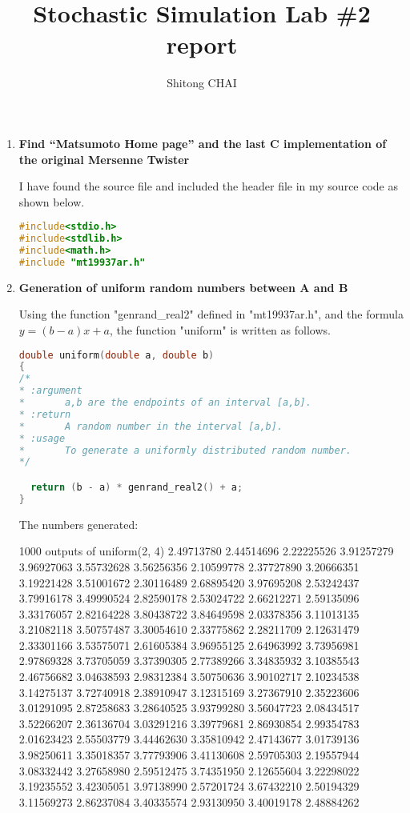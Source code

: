 \documentclass{article}
\title{Stochastic Simulation Lab \#2 report}
\author{Shitong CHAI}
\date{}
\begin{document}
\maketitle 

\begin{enumerate}
\item{\textbf{Find “Matsumoto Home page” and the last C implementation of the original Mersenne Twister}}

I have found the source file and included the header file in my source code as shown below.
\begin{lstlisting}[language=C]
#include<stdio.h>
#include<stdlib.h>
#include<math.h>
#include "mt19937ar.h"
\end{lstlisting}

\item{\textbf{Generation of uniform random numbers between A and B}}

Using the function "genrand\_real2" defined in "mt19937ar.h", and the formula $y=(b-a)x+a$, the function "uniform" is written as follows.

\begin{lstlisting}[language=C]
double uniform(double a, double b)
{
/*
* :argument 
*       a,b are the endpoints of an interval [a,b]. 
* :return  
*       A random number in the interval [a,b].
* :usage
*       To generate a uniformly distributed random number.
*/

  return (b - a) * genrand_real2() + a;
}
\end{lstlisting}
The numbers generated:
\begin{messageshell}
1000 outputs of uniform(2, 4)
2.49713780 2.44514696 2.22225526 3.91257279 3.96927063
3.55732628 3.56256356 2.10599778 2.37727890 3.20666351
3.19221428 3.51001672 2.30116489 2.68895420 3.97695208
2.53242437 3.79916178 3.49990524 2.82590178 2.53024722
2.66212271 2.59135096 3.33176057 2.82164228 3.80438722
3.84649598 2.03378356 3.11013135 3.21082118 3.50757487
3.30054610 2.33775862 2.28211709 2.12631479 2.33301166
3.53575071 2.61605384 3.96955125 2.64963992 3.73956981
2.97869328 3.73705059 3.37390305 2.77389266 3.34835932
3.10385543 2.46756682 3.04638593 2.98312384 3.50750636
3.90102717 2.10234538 3.14275137 3.72740918 2.38910947
3.12315169 3.27367910 2.35223606 3.01291095 2.87258683
3.28640525 3.93799280 3.56047723 2.08434517 3.52266207
2.36136704 3.03291216 3.39779681 2.86930854 2.99354783
2.01623423 2.55503779 3.44462630 3.35810942 2.47143677
3.01739136 3.98250611 3.35018357 3.77793906 3.41130608
2.59705303 2.19557944 3.08332442 3.27658980 2.59512475
3.74351950 2.12655604 3.22298022 3.19235552 3.42305051
3.97138990 2.57201724 3.67432210 2.50194329 3.11569273
2.86237084 3.40335574 2.93130950 3.40019178 2.48884262


\end{messageshell}
\end{enumerate}
\end{document}
